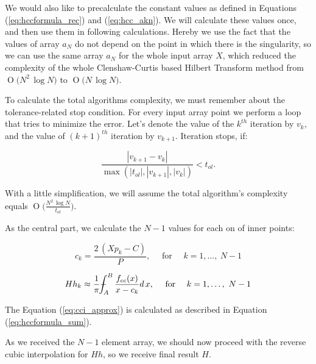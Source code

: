 \documentclass[12pt,twoside,a4paper]{article}
\numberwithin{equation}{subsection}
\numberwithin{figure}{subsection}
\def\Xint#1{\mathchoice
{\XXint\displaystyle\textstyle{#1}}%
{\XXint\textstyle\scriptstyle{#1}}%
{\XXint\scriptstyle\scriptscriptstyle{#1}}%
{\XXint\scriptscriptstyle\scriptscriptstyle{#1}}%
\!\int}
\def\XXint#1#2#3{{\setbox0=\hbox{$#1{#2#3}{\int}$ }\vcenter{\hbox{$#2#3$ }}\kern-.6\wd0}}
\def\dashint{\Xint-}
\newcommand{\BigO}[1]{\ensuremath{\operatorname{O}\bigl(#1\bigr)}}
\begin{document}
We would also like to precalculate the constant values as defined in Equations (\ref{eq:hccformula_rec}) and (\ref{eq:hcc_akn}). We will calculate these values once, and then use them in following calculations. Hereby we use the fact that the values of array $a_N$ do not depend on the point in which there is the singularity, so we can use the same array $a_N$ for the whole input array $X$, which reduced the complexity of the whole Clenshaw-Curtis based Hilbert Transform method from $\BigO{N^2 \, \log{N}}$ to $\BigO{N \, \log{N}}$. 

To calculate the total algorithms complexity, we must remember about the tolerance-related stop condition. For every input array point we perform a loop that tries to minimize the error. Let's denote the value of the $k^{th}$ iteration by $v_k$, and the value of $(k+1)^{th}$ iteration by $v_{k+1}$. Iteration stops, if:

\begin{equation}
  \frac{|v_{k+1} - v_k|} {\max\left(|t_{ol}|, |v_{k+1}|, |v_k| \right)} < t_{ol} .
\end{equation}

With a little simplification, we will assume the total algorithm's complexity equals $\BigO{\frac{N^2 \, \log{N}}{t_{ol}} }$. 

As the central part, we calculate the $N-1$ values for each on of inner points: 

\begin{equation} \label{eq:cci_newd}
	c_k = \frac{2 \, (Xp_k - C ) }{P}, \quad \text{ for } \quad k = 1, \ldots, \ N-1
\end{equation}

\begin{equation} \label{eq:cci_approx}
  Hh_k \approx \frac{1}{\pi} \dashint_{A}^{B} \frac{f_{cc}(x)}{x - c_k} d \, x, \quad \text{ for } \quad k = 1,
  \ldots , \ N-1
\end{equation}

The Equation (\ref{eq:cci_approx}) is calculated as described in Equation (\ref{eq:hccformula_sum}).

As we received the $N-1$ element array, we should now proceed with the reverse cubic interpolation for $Hh$, so we receive final result $H$.
\end{document}
